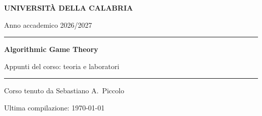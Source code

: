 \documentclass[11pt, a4paper, oneside, openany]{book}
\begin{document}
\frontmatter

\hypersetup{pageanchor=false}
\begin{titlepage}
  \centering
  \vspace*{3cm}
  {\sffamily\bfseries\color{unical}\large UNIVERSITÀ DELLA CALABRIA\par}
  \vspace{0.3cm}
  {\sffamily\color{grigio}Anno accademico 2026/2027\par}
  \vspace{2.5cm}
  {\color{blu}\rule{\linewidth}{1.2pt}\par}
  \vspace{0.6cm}
  {\sffamily\bfseries\Huge\color{blu} Algorithmic Game Theory\par}
  \vspace{0.4cm}
  {\sffamily\Large Appunti del corso: teoria e laboratori\par}
  \vspace{0.6cm}
  {\color{blu}\rule{\linewidth}{1.2pt}\par}
  \vspace{1.5cm}
  {\large Corso tenuto da Sebastiano A.\ Piccolo\par}
  \vfill
  {\small\color{grigio} Ultima compilazione: \today\par}
\end{titlepage}
\hypersetup{pageanchor=true}

\tableofcontents

\mainmatter

\end{document}
